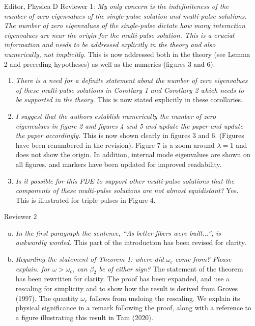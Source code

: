\documentclass[11pt]{letter}
\begin{document}
\begin{letter}{Editor, Physica D}
Reviewer 1: \emph{My only concern is the indefiniteness of the number of zero eigenvalues of the single-pulse solution and multi-pulse solutions. The number of zero eigenvalues of the single-pulse dictate how many interaction eigenvalues are near the origin for the multi-pulse solution. This is a crucial information and needs to be addressed explicitly in the theory and also numerically, not implicitly.} This is now addressed both in the theory (see Lemma 2 and preceding hypotheses) as well as the numerics (figures 3 and 6).

\begin{enumerate}
\item \emph{There is a need for a definite statement about the number of zero eigenvalues of these multi-pulse solutions in Corollary 1 and Corollary 2 which needs to be supported in the theory.} This is now stated explicitly in these corollaries. 
\vspace{4mm}

\item \emph{I suggest that the authors establish numerically the number of zero eigenvalues in figure 2 and figures 4 and 5 and update the paper and update the paper accordingly.}
This is now shown clearly in figures 3 and 6. (Figures have been renumbered in the revision). Figure 7 is a zoom around $\lambda = 1$ and does not show the origin. In addition, internal mode eigenvalues are shown on all figures, and markers have been updated for improved readability.
\vspace{4mm} 

\item \emph{Is it possible for this PDE to support other multi-pulse solutions that the components of these multi-pulse solutions are not almost equidistant?} Yes. This is illustrated for triple pulses in Figure 4.
\vspace{4mm}
\end{enumerate}

Reviewer 2
\begin{enumerate}[(a)]
\item \emph{In the first paragraph the sentence, ``As better fibers were built...'', is awkwardly worded.} This part of the introduction has been revised for clarity.
\vspace{4mm}

\item \emph{Regarding the statement of Theorem 1: where did $\omega_c$ come from? Please explain.
for $\omega > \omega_c$, can $\beta_2$ be of either sign?} The statement of the theorem has been rewritten for clarity. The proof has been expanded, and use a rescaling for simplicity and to show how the result is derived from Groves (1997). The quantity $\omega_c$ follows from undoing the rescaling. We explain its physical significance in a remark following the proof, along with a reference to a figure illustrating this result in Tam (2020).
\vspace{4mm}


\end{enumerate}
\end{letter}
\end{document}
